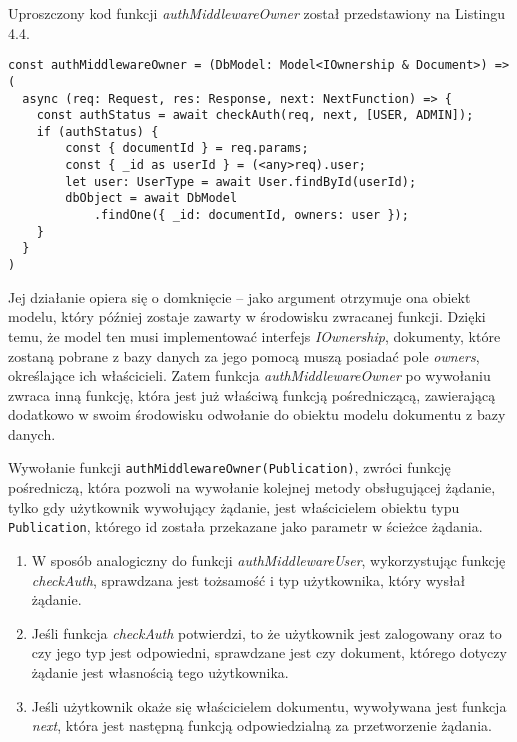 \documentclass[a4paper,12pt,twoside,openany]{report}
\begin{document}
Uproszczony kod funkcji \textit{authMiddlewareOwner} został przedstawiony na Listingu 4.4.
\begin{lstlisting}[caption=Sygnatura funkcji authMiddlewareOwner,label=code1,captionpos=b]
const authMiddlewareOwner = (DbModel: Model<IOwnership & Document>) => (
  async (req: Request, res: Response, next: NextFunction) => {
	const authStatus = await checkAuth(req, next, [USER, ADMIN]);
	if (authStatus) {	
		const { documentId } = req.params;
		const { _id as userId } = (<any>req).user;
		let user: UserType = await User.findById(userId);
		dbObject = await DbModel
			.findOne({ _id: documentId, owners: user });
	}           
  }
)
\end{lstlisting}

Jej działanie opiera się o domknięcie -- jako argument otrzymuje ona obiekt modelu, który później zostaje zawarty w środowisku zwracanej funkcji. Dzięki temu, że model ten musi implementować interfejs \textit{IOwnership}, dokumenty, które zostaną pobrane z bazy danych za jego pomocą muszą posiadać pole \textit{owners}, określające ich właścicieli.
Zatem funkcja  \textit{authMiddlewareOwner} po wywołaniu zwraca inną funkcję, która jest już właściwą funkcją pośredniczącą, zawierającą dodatkowo w swoim środowisku odwołanie do obiektu modelu dokumentu z bazy danych. 

Wywołanie funkcji \verb|authMiddlewareOwner(Publication)|, zwróci funkcję pośredniczą, która pozwoli na wywołanie kolejnej metody obsługującej żądanie, tylko gdy użytkownik wywołujący żądanie, jest właścicielem obiektu typu \verb|Publication|, którego id została przekazane jako parametr w ścieżce żądania.

\begin{enumerate}
	
	\item W sposób analogiczny do funkcji \textit{authMiddlewareUser}, wykorzystując funkcję \textit{checkAuth}, sprawdzana jest tożsamość i typ użytkownika, który wysłał żądanie.
	
	\item Jeśli funkcja \textit{checkAuth} potwierdzi, to że użytkownik jest zalogowany oraz to czy jego typ jest odpowiedni, sprawdzane jest czy dokument, którego dotyczy żądanie jest własnością tego użytkownika. 
	
	\item Jeśli użytkownik okaże się właścicielem dokumentu, wywoływana jest funkcja \textit{next}, która jest następną funkcją odpowiedzialną za przetworzenie żądania.
\end{enumerate}
\end{document}
